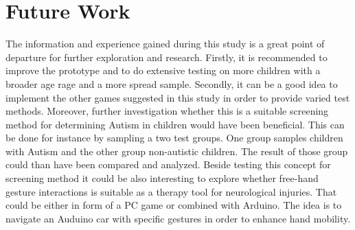 \section{Future Work}
\label{sec:future}


The information and experience gained during this study is a great point of departure for further exploration and research.  
Firstly, it is recommended to improve the prototype and to do extensive testing on more children with a broader age rage and a more spread sample. Secondly, it can be a good idea to implement the other games suggested in this study in order to provide varied test methods.
Moreover, further investigation whether this is a suitable screening method for determining Autism in children would have been beneficial. This can be done for instance by sampling a two test groups. One group samples children with Autism and the other group non-autistic children. The result of those group could than have been compared and analyzed. 
Beside testing this concept for screening method it could be also interesting to explore whether free-hand gesture interactions is suitable as a therapy tool for neurological injuries. That could be either in form of a PC game or combined with Arduino. The idea is to navigate an Auduino car with specific gestures in order to enhance hand mobility.  




